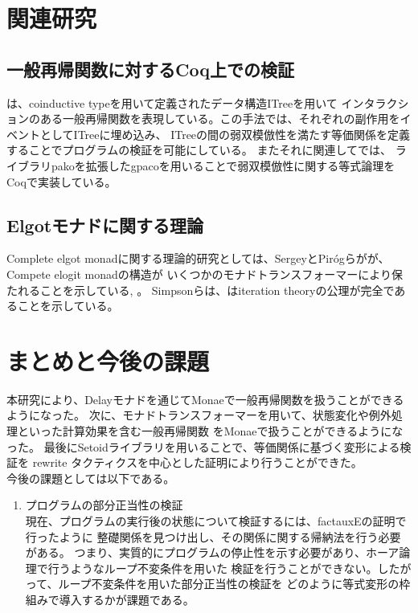 \documentclass[japanese]{jssst_ppl}
\theoremstyle{definition}
\begin{document}
\section{関連研究}
\subsection{一般再帰関数に対するCoq上での検証}
\cite{10.1145/3371119}は、coinductive typeを用いて定義されたデータ構造ITreeを用いて
インタラクションのある一般再帰関数を表現している。この手法では、それぞれの副作用をイベントとしてITreeに埋め込み、
ITreeの間の弱双模倣性を満たす等価関係を定義することでプログラムの検証を可能にしている。
またそれに関連して\cite{10.1145/3372885.3373813}では、
ライブラリpakoを拡張したgpacoを用いることで弱双模倣性に関する等式論理をCoqで実装している。

\subsection{Elgotモナドに関する理論}
Complete elgot monadに関する理論的研究としては、SergeyとPirógらがが、Compete elogit monadの構造が
いくつかのモナドトランスフォーマーにより保たれることを示している\cite{GONCHAROV2015183}, \cite{PIROG2014273}。
Simpsonらは、はiteration theoryの公理が完全であることを示している\cite{cacmfpo}。

\section{まとめと今後の課題}
本研究により、Delayモナドを通じてMonaeで一般再帰関数を扱うことができるようになった。
次に、モナドトランスフォーマーを用いて、状態変化や例外処理といった計算効果を含む一般再帰関数
をMonaeで扱うことができるようになった。
最後にSetoidライブラリを用いることで、等価関係に基づく変形による検証を
rewrite タクティクスを中心とした証明により行うことができた。\\


今後の課題としては以下である。
\begin{enumerate}
  \item プログラムの部分正当性の検証\\
        現在、プログラムの実行後の状態について検証するには、factauxEの証明で行ったように
        整礎関係を見つけ出し、その関係に関する帰納法を行う必要がある。
        つまり、実質的にプログラムの停止性を示す必要があり、ホーア論理で行うようなループ不変条件を用いた
        検証を行うことができない。したがって、ループ不変条件を用いた部分正当性の検証を
        どのように等式変形の枠組みで導入するかが課題である。
\end{enumerate}
\end{document}
